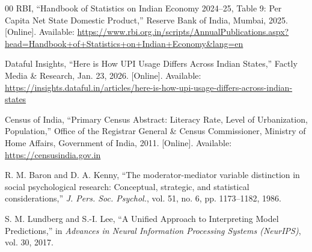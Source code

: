 \documentclass[conference]{IEEEtran}
\begin{document}
\begin{thebibliography}{00}
RBI, ``Handbook of Statistics on Indian Economy 2024--25, Table 9: Per Capita Net State Domestic Product,'' Reserve Bank of India, Mumbai, 2025. [Online]. Available: \url{https://www.rbi.org.in/scripts/AnnualPublications.aspx?head=Handbook+of+Statistics+on+Indian+Economy&lang=en}

Dataful Insights, ``Here is How UPI Usage Differs Across Indian States,'' Factly Media \& Research, Jan. 23, 2026. [Online]. Available: \url{https://insights.dataful.in/articles/here-is-how-upi-usage-differs-across-indian-states}

Census of India, ``Primary Census Abstract: Literacy Rate, Level of Urbanization, Population,'' Office of the Registrar General \& Census Commissioner, Ministry of Home Affairs, Government of India, 2011. [Online]. Available: \url{https://censusindia.gov.in}

R. M. Baron and D. A. Kenny, ``The moderator-mediator variable distinction in social psychological research: Conceptual, strategic, and statistical considerations,'' \textit{J. Pers. Soc. Psychol.}, vol. 51, no. 6, pp. 1173--1182, 1986.

S. M. Lundberg and S.-I. Lee, ``A Unified Approach to Interpreting Model Predictions,'' in \textit{Advances in Neural Information Processing Systems (NeurIPS)}, vol. 30, 2017.

\end{thebibliography}
\end{document}
